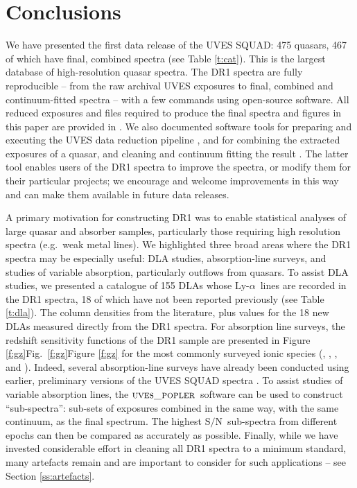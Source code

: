 \documentclass[fleqn,usenatbib,usedcolumn]{mnras}
\newcommand{\Sref}[1]{Section \ref{#1}}
\newcommand{\Tref}[1]{Table \ref{#1}}
\newcommand{\Fref}[1]{\ifhmode \ifnum\spacefactor=1001 Figure \ref{#1}\else Fig.\ \ref{#1}\fi \else Figure \ref{#1}\fi}
\newcommand{\SN}{\ensuremath{\textrm{S/N}}}
\newcommand{\lya}{\ensuremath{\textrm{Ly-}\alpha}}
\newcommand{\headsort}{\ensuremath{\textsc{uves\_headsort}}}
\newcommand{\popler}{\ensuremath{\textsc{uves\_popler}}}
\begin{document}
\section{Conclusions}\label{s:conclusion}

We have presented the first data release of the UVES SQUAD: 475 quasars, 467 of which have final, combined spectra (see \Tref{t:cat}). This is the largest database of high-resolution quasar spectra. The DR1 spectra are fully reproducible -- from the raw archival UVES exposures to final, combined and continuum-fitted spectra -- with a few commands using open-source software. All reduced exposures and files required to produce the final spectra and figures in this paper are provided in \citet{Murphy:2018:UVESSQUADDR1}. We also documented software tools for preparing and executing the UVES data reduction pipeline \citep[\headsort;][]{Murphy:2016:UVESheadsort}, and for combining the extracted exposures of a quasar, and cleaning and continuum fitting the result \citep[\popler;][]{Murphy:2016:UVESpopler}. The latter tool enables users of the DR1 spectra to improve the spectra, or modify them for their particular projects; we encourage and welcome improvements in this way and can make them available in future data releases.

A primary motivation for constructing DR1 was to enable statistical analyses of large quasar and absorber samples, particularly those requiring high resolution spectra (e.g.\ weak metal lines). We highlighted three broad areas where the DR1 spectra may be especially useful: DLA studies, absorption-line surveys, and studies of variable absorption, particularly outflows from quasars. To assist DLA studies, we presented a catalogue of 155 DLAs whose \lya\ lines are recorded in the DR1 spectra, 18 of which have not been reported previously (see \Tref{t:dla}). The  column densities from the literature, plus values for the 18 new DLAs measured directly from the DR1 spectra. For absorption line surveys, the redshift sensitivity functions of the DR1 sample are presented in \Fref{f:gz} for the most commonly surveyed ionic species (, , ,  and ). Indeed, several absorption-line surveys have already been conducted using earlier, preliminary versions of the UVES SQUAD spectra \citep[e.g.][]{Richter:2011:A12,BenBekhti:2012:A110,Nielsen:2013:114,Mas-Ribas:2018:50,Mathes:2018}. To assist studies of variable absorption lines, the \popler\ software can be used to construct ``sub-spectra'': sub-sets of exposures combined in the same way, with the same continuum, as the final spectrum. The highest \SN\ sub-spectra from different epochs can then be compared as accurately as possible. Finally, while we have invested considerable effort in cleaning all DR1 spectra to a minimum standard, many artefacts remain and are important to consider for such applications -- see \Sref{ss:artefacts}.
\end{document}
